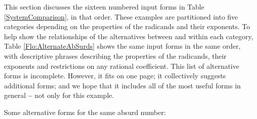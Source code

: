 \documentclass[12pt,english]{article}
\theoremstyle{definition}
\theoremstyle{remark}
\theoremstyle{plain}
\theoremstyle{plain}
\begin{document}
This section discusses the sixteen numbered input forms in Table \ref{SystemComparison},
in that order. These examples are partitioned into five categories
depending on the properties of the radicands and their exponents.
To help show the relationships of the alternatives between and within
each category, Table \ref{Flo:AlternateAbSurds} shows the same input
forms in the same order, with descriptive phrases describing the properties
of the radicands, their exponents and restrictions on any rational
coefficient. This list of alternative forms is incomplete. However,
it fits on one page; it collectively suggests additional forms; and
we hope that it includes all of the most useful forms in general \textbf{--}
not only for this example.

\begin{table}[!h]
\caption{Some alternative forms for the same absurd number:}
\label{Flo:AlternateAbSurds}


\end{table}
\end{document}
